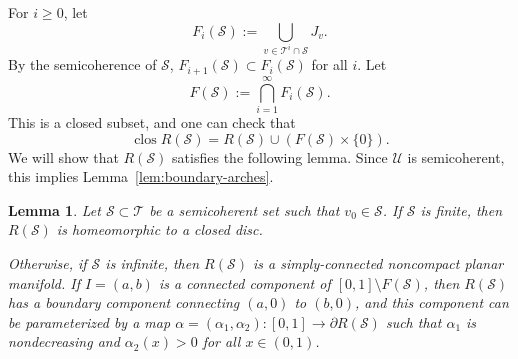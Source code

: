 \documentclass[12pt,reqno]{amsart}
\newcommand{\cS}{\mathcal{S}}
\newcommand{\cT}{\mathcal{T}}
\newcommand{\cU}{\mathcal{U}}
\newcommand{\from}{\colon}
\newtheorem{lemma}[thm]{Lemma}
\theoremstyle{remark}
\newcommand{\0}{\mathbf{0}}
\renewcommand{\1}{\mathbf 1}
\DeclareMathOperator{\closure}{clos}
\begin{document}
For $i\ge 0$, let
$$F_i(\cS) := \bigcup_{v\in \cT^i\cap \cS} J_v.$$
By the semicoherence of $\cS$, $F_{i+1}(\cS) \subset F_i(\cS)$ for all $i$. Let
\begin{equation}\label{eq:def-F-boundary}
  F(\cS) := \bigcap_{i=1}^\infty F_i(\cS).
\end{equation}
This is a closed subset, and one can check that
$$\closure R(\cS) = R(\cS) \cup (F(\cS)\times \{0\}).$$
We will show that $R(\cS)$ satisfies the following lemma. Since $\cU$ is semicoherent, this implies Lemma~\ref{lem:boundary-arches}.

\begin{lemma}\label{lem:coherent-boundary}
  Let $\cS\subset \cT$ be a semicoherent set such that $v_0\in \cS$. If $\cS$ is finite, then $R(\cS)$ is homeomorphic to a closed disc.

  Otherwise, if $\cS$ is infinite, then $R(\cS)$ is a simply-connected noncompact planar manifold. If $I=(a,b)$ is a connected component of $[0,1]\setminus F(\cS)$, then $R(\cS)$ has a boundary component connecting $(a,0)$ to $(b,0)$, and this component can be parameterized by a map $\alpha=(\alpha_1,\alpha_2)\from [0,1]\to \partial R(\cS)$ such that $\alpha_1$ is nondecreasing and $\alpha_2(x)>0$ for all $x\in (0,1)$.
\end{lemma}
\end{document}
